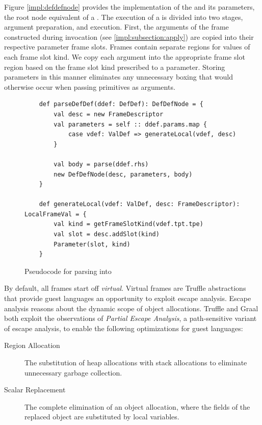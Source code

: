 Figure \ref{impl:defdefnode} provides the implementation of the  and its parameters, the root node equivalent of a .
The execution of a  is divided into two stages, argument preparation, and execution.
First, the arguments of the frame constructed during invocation (see \ref{impl:subsection:apply}) are copied into their respective parameter frame slots.
Frames contain separate regions for values of each frame slot kind.
We copy each argument into the appropriate frame slot region based on the frame slot kind prescribed to a parameter.
Storing parameters in this manner eliminates any unnecessary boxing that would otherwise occur when passing primitives as arguments.

\begin{figure}[!htb]
	\begin{verbatim}
	def parseDefDef(ddef: DefDef): DefDefNode = {
		val desc = new FrameDescriptor
		val parameters = self :: ddef.params.map {
			case vdef: ValDef => generateLocal(vdef, desc)
		}
			
		val body = parse(ddef.rhs)
		new DefDefNode(desc, parameters, body)
	}
		
	def generateLocal(vdef: ValDef, desc: FrameDescriptor): LocalFrameVal = {
		val kind = getFrameSlotKind(vdef.tpt.tpe)
		val slot = desc.addSlot(kind)
		Parameter(slot, kind)
	}
	\end{verbatim}
	\caption{Pseudocode for parsing  into }
	\label{impl:parse-defdef}
\end{figure}

By default, all frames start off \textit{virtual}.
Virtual frames are Truffle abstractions that provide guest languages an opportunity to exploit escape analysis.
Escape analysis\cite{escape-analysis} reasons about the dynamic scope of object allocations. 
Truffle and Graal both exploit the observations of \textit{Partial Escape Analysis}\cite{java:partial-escape-analysis}, a path-sensitive variant of escape analysis, to enable the following optimizations for guest languages:

\begin{description}
	\item[Region Allocation\cite{java:escape-analysis}\cite{tofte:region-memory}] The substitution of heap allocations with stack allocations to eliminate unnecessary garbage collection.
	\item[Scalar Replacement\cite{java:escape-analysis-optimizations}] The complete elimination of an object allocation, where the fields of the replaced object are substituted by local variables.
\end{description}

